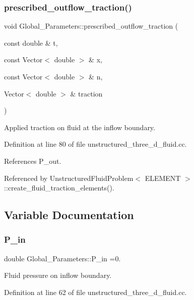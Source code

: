\subsubsection{\texorpdfstring{prescribed\+\_\+outflow\+\_\+traction()}{prescribed\_outflow\_traction()}}
{\footnotesize\ttfamily void Global\+\_\+\+Parameters\+::prescribed\+\_\+outflow\+\_\+traction (\begin{DoxyParamCaption}\item[{const double \&}]{t,  }\item[{const Vector$<$ double $>$ \&}]{x,  }\item[{const Vector$<$ double $>$ \&}]{n,  }\item[{Vector$<$ double $>$ \&}]{traction }\end{DoxyParamCaption})}



Applied traction on fluid at the inflow boundary. 



Definition at line 80 of file unstructured\+\_\+three\+\_\+d\+\_\+fluid.\+cc.



References P\+\_\+out.



Referenced by Unstructured\+Fluid\+Problem$<$ E\+L\+E\+M\+E\+N\+T $>$\+::create\+\_\+fluid\+\_\+traction\+\_\+elements().



\subsection{Variable Documentation}
\mbox{\label{namespaceGlobal__Parameters_a05b26d00935600b5e0149872844f224c}} 
\subsubsection{\texorpdfstring{P\+\_\+in}{P\_in}}
{\footnotesize\ttfamily double Global\+\_\+\+Parameters\+::\+P\+\_\+in =0.}



Fluid pressure on inflow boundary. 



Definition at line 62 of file unstructured\+\_\+three\+\_\+d\+\_\+fluid.\+cc.



